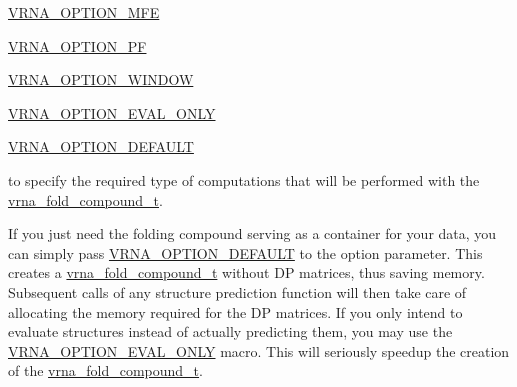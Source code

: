 \begin{DoxyItemize}
\item \hyperlink{group__fold__compound_gae63be9127fe7dcc1f9bb14f5bb1064ee}{V\+R\+N\+A\+\_\+\+O\+P\+T\+I\+O\+N\+\_\+\+M\+FE}
\item \hyperlink{group__fold__compound_gabfbadcddda3e74ce7f49035ef8f058f7}{V\+R\+N\+A\+\_\+\+O\+P\+T\+I\+O\+N\+\_\+\+PF}
\item \hyperlink{group__fold__compound_ga2b2a8009ccdccc3eb1571556261aee8e}{V\+R\+N\+A\+\_\+\+O\+P\+T\+I\+O\+N\+\_\+\+W\+I\+N\+D\+OW}
\item \hyperlink{group__fold__compound_ga61469c423131552c8483229f8b6c7e0e}{V\+R\+N\+A\+\_\+\+O\+P\+T\+I\+O\+N\+\_\+\+E\+V\+A\+L\+\_\+\+O\+N\+LY}
\item \hyperlink{group__fold__compound_gacea5b7ee6181c485f36e2afa0e9089e4}{V\+R\+N\+A\+\_\+\+O\+P\+T\+I\+O\+N\+\_\+\+D\+E\+F\+A\+U\+LT}
\end{DoxyItemize}

to specify the required type of computations that will be performed with the \hyperlink{group__fold__compound_ga1b0cef17fd40466cef5968eaeeff6166}{vrna\+\_\+fold\+\_\+compound\+\_\+t}.

If you just need the folding compound serving as a container for your data, you can simply pass \hyperlink{group__fold__compound_gacea5b7ee6181c485f36e2afa0e9089e4}{V\+R\+N\+A\+\_\+\+O\+P\+T\+I\+O\+N\+\_\+\+D\+E\+F\+A\+U\+LT} to the {\ttfamily option} parameter. This creates a \hyperlink{group__fold__compound_ga1b0cef17fd40466cef5968eaeeff6166}{vrna\+\_\+fold\+\_\+compound\+\_\+t} without DP matrices, thus saving memory. Subsequent calls of any structure prediction function will then take care of allocating the memory required for the DP matrices. If you only intend to evaluate structures instead of actually predicting them, you may use the \hyperlink{group__fold__compound_ga61469c423131552c8483229f8b6c7e0e}{V\+R\+N\+A\+\_\+\+O\+P\+T\+I\+O\+N\+\_\+\+E\+V\+A\+L\+\_\+\+O\+N\+LY} macro. This will seriously speedup the creation of the \hyperlink{group__fold__compound_ga1b0cef17fd40466cef5968eaeeff6166}{vrna\+\_\+fold\+\_\+compound\+\_\+t}.

